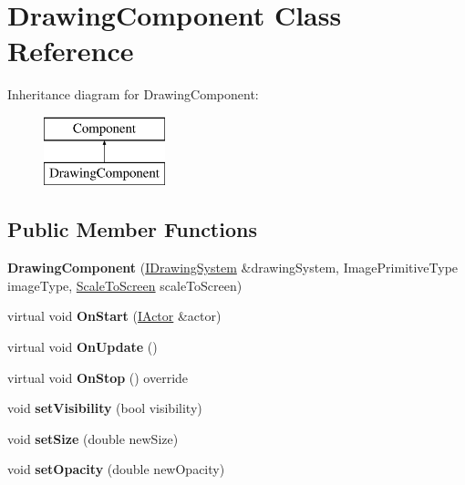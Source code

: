\hypertarget{classDrawingComponent}{}\section{Drawing\+Component Class Reference}
\label{classDrawingComponent}
Inheritance diagram for Drawing\+Component\+:\begin{figure}[H]
\begin{center}
\leavevmode
\includegraphics[height=2.000000cm]{classDrawingComponent}
\end{center}
\end{figure}
\subsection*{Public Member Functions}
\begin{DoxyCompactItemize}
\item 
{\bfseries Drawing\+Component} (\hyperlink{classIDrawingSystem}{I\+Drawing\+System} \&drawing\+System, Image\+Primitive\+Type image\+Type, \hyperlink{classScaleToScreen}{Scale\+To\+Screen} scale\+To\+Screen)\hypertarget{classDrawingComponent_a301d028efe8d8184505de81340ccc4a8}{}\label{classDrawingComponent_a301d028efe8d8184505de81340ccc4a8}

\item 
virtual void {\bfseries On\+Start} (\hyperlink{classIActor}{I\+Actor} \&actor)\hypertarget{classDrawingComponent_af7646ccd54c1dd039324d41920b620fe}{}\label{classDrawingComponent_af7646ccd54c1dd039324d41920b620fe}

\item 
virtual void {\bfseries On\+Update} ()\hypertarget{classDrawingComponent_a9b8eeab28d761e6925a1d0f0054f2ce3}{}\label{classDrawingComponent_a9b8eeab28d761e6925a1d0f0054f2ce3}

\item 
virtual void {\bfseries On\+Stop} () override\hypertarget{classDrawingComponent_a92bbdfe3616001865c088c91ace5deaf}{}\label{classDrawingComponent_a92bbdfe3616001865c088c91ace5deaf}

\item 
void {\bfseries set\+Visibility} (bool visibility)\hypertarget{classDrawingComponent_a4bc3672c2ff7a4129ef48b5611a05d25}{}\label{classDrawingComponent_a4bc3672c2ff7a4129ef48b5611a05d25}

\item 
void {\bfseries set\+Size} (double new\+Size)\hypertarget{classDrawingComponent_ae7631f36b8bb0db4e01e12fad9700b7e}{}\label{classDrawingComponent_ae7631f36b8bb0db4e01e12fad9700b7e}

\item 
void {\bfseries set\+Opacity} (double new\+Opacity)\hypertarget{classDrawingComponent_acededee6a3dcb890d1961a7a6ba1a51d}{}\label{classDrawingComponent_acededee6a3dcb890d1961a7a6ba1a51d}

\end{DoxyCompactItemize}


